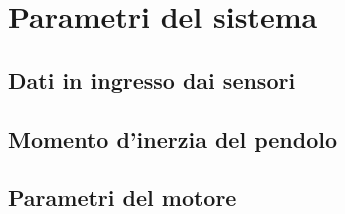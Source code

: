 \section{Parametri del sistema}
\subsection{Dati in ingresso dai sensori}
\subsection{Momento d'inerzia del pendolo}
\subsection{Parametri del motore}
